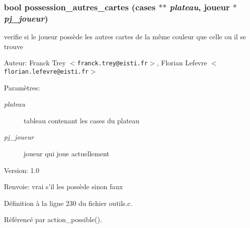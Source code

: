 \subsubsection{\setlength{\rightskip}{0pt plus 5cm}bool possession\_\-autres\_\-cartes ({\bf cases} $\ast$$\ast$ {\em plateau}, {\bf joueur} $\ast$ {\em pj\_\-joueur})}\label{outils_8h_914637efff042e343c9bb0befab2f609}


verifie si le joueur poss\`{e}de les autres cartes de la m\^{e}me couleur que celle ou il se trouve 

\begin{Desc}
\item[Auteur:]Franck Trey $<${\tt franck.trey@eisti.fr}$>$, Florian Lefevre $<${\tt florian.lefevre@eisti.fr}$>$\end{Desc}
\begin{Desc}
\item[Param\`{e}tres:]
\begin{description}
\item[{\em plateau}]tableau contenant les cases du plateau \item[{\em pj\_\-joueur}]joueur qui joue actuellement\end{description}
\end{Desc}
\begin{Desc}
\item[Version:]1.0 \end{Desc}
\begin{Desc}
\item[Renvoie:]vrai s'il les poss\`{e}de sinon faux \end{Desc}


D\'{e}finition \`{a} la ligne 230 du fichier outils.c.

R\'{e}f\'{e}renc\'{e} par action\_\-possible().

